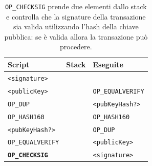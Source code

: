 \begin{table}[H]
    \centering
    \begin{tabular}{p{3cm}|p{7.7cm}|p{3cm}}
        Script & Stack & Eseguite\\
        \hline
        \texttt{<signature>}              &  &\\
        \texttt{<publicKey>}              &  & \texttt{OP\_EQUALVERIFY}\\
        \texttt{OP\_DUP}                  &  & \texttt{<pubKeyHash?>}\\
        \texttt{OP\_HASH160}              &  & \texttt{OP\_HASH160}\\
        \texttt{<pubKeyHash?>}            &  & \texttt{OP\_DUP}\\
        \texttt{OP\_EQUALVERIFY}          &  & \texttt{<publicKey>}\\
        \texttt{\textbf{OP\_CHECKSIG}}    &  & \texttt{<signature>}\\
    \end{tabular}
    \caption{\texttt{OP\_CHECKSIG} prende due elementi dallo stack e controlla che la signature della transazione sia valida utilizzando l'hash della chiave pubblica: se è valida allora la transazione può procedere.}
\end{table}

